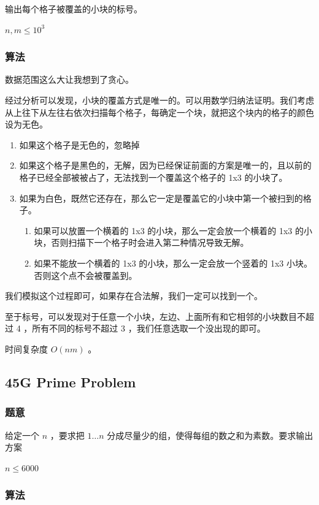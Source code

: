 \documentclass[11pt]{article}
\begin{document}
    输出每个格子被覆盖的小块的标号。

    $n, m \leq 10^3$
\subsubsection{算法}
\label{sec-3-6-2}

    数据范围这么大让我想到了贪心。

    经过分析可以发现，小块的覆盖方式是唯一的。可以用数学归纳法证明。我们考虑从上往下从左往右依次扫描每个格子，每确定一个块，就把这个块内的格子的颜色设为无色。
\begin{enumerate}
\item 如果这个格子是无色的，忽略掉
\item 如果这个格子是黑色的，无解，因为已经保证前面的方案是唯一的，且以前的格子已经全部被被占了，无法找到一个覆盖这个格子的 1x3 的小块了。
\item 如果为白色，既然它还存在，那么它一定是覆盖它的小块中第一个被扫到的格子。
\begin{enumerate}
\item 如果可以放置一个横着的 1x3 的小块，那么一定会放一个横着的 1x3 的小块，否则扫描下一个格子时会进入第二种情况导致无解。
\item 如果不能放一个横着的 1x3 的小块，那么一定会放一个竖着的 1x3 小块。否则这个点不会被覆盖到。
\end{enumerate}
\end{enumerate}


    我们模拟这个过程即可，如果存在合法解，我们一定可以找到一个。
    
    至于标号，可以发现对于任意一个小块，左边、上面所有和它相邻的小块数目不超过 4 ，所有不同的标号不超过 3 ，我们任意选取一个没出现的即可。

    时间复杂度 $O(nm)$ 。
\subsection{45G   Prime Problem}
\label{sec-3-7}
\subsubsection{题意}
\label{sec-3-7-1}

    给定一个 $n$ ，要求把 $1 \dots n$ 分成尽量少的组，使得每组的数之和为素数。要求输出方案

    $n \leq 6000$
\subsubsection{算法}
\label{sec-3-7-2}
\end{document}
